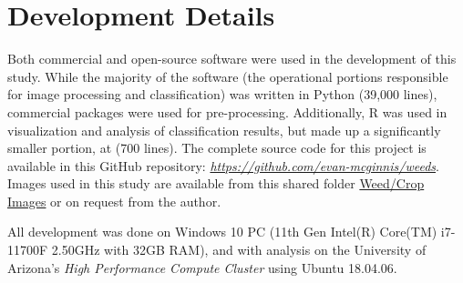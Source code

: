 \documentclass[letterpaper, notitlepage]{report}
\begin{document}
\chapter{Development Details}
Both commercial and open-source software were used in the development of this study. While the majority of the software (the operational portions responsible for image processing and classification) was written in Python (39,000 lines), commercial packages were used for pre-processing. Additionally, R was used in visualization and analysis of classification results, but made up a significantly smaller portion, at (700 lines). The complete source code for this project is available in this GitHub repository: \href{https://github.com/evan-mcginnis/weeds}{\textit {https://github.com/evan-mcginnis/weeds}}. Images used in this study are available from this shared folder \href{https://emailarizona-my.sharepoint.com/:f:/g/personal/evanmc\_arizona\_edu/ElPy25DJYjtAm94WXnoB\_v8BOZOxef6T1ozZZSftCgNTKQ?e=XhDzbj}{Weed/Crop Images} or on request from the author.

All development was done on Windows 10 PC (11th Gen Intel(R) Core(TM) i7-11700F \@ 2.50GHz with 32GB RAM), and  with analysis on the University of Arizona's \textit{High Performance Compute Cluster} using Ubuntu 18.04.06.
\end{document}
